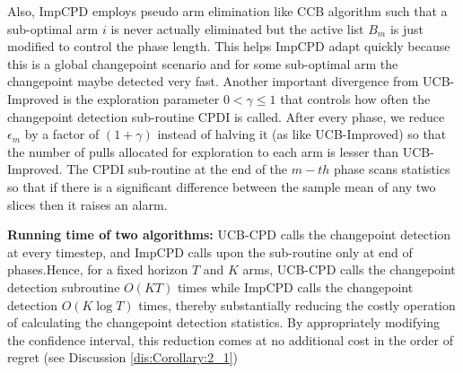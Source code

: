 Also, ImpCPD employs pseudo arm elimination like CCB \citep{liu2016modification} algorithm such that a sub-optimal arm $i$ is never actually eliminated but the active list $B_m$ is just modified to control the phase length. This helps ImpCPD adapt quickly because this is a global changepoint scenario and for some sub-optimal arm the changepoint maybe detected very fast. Another important divergence from UCB-Improved is the exploration parameter $0<\gamma\leq 1$ that controls how often the changepoint detection sub-routine CPDI is called. After every phase, we reduce $\epsilon_m$  by a factor of $\left( 1+\gamma\right)$ instead of halving it (as like UCB-Improved) so that the number of pulls allocated for exploration to each arm is lesser than UCB-Improved. The CPDI sub-routine at the end of the $m-th$ phase scans statistics so that if there is a significant difference between the sample mean of any two slices then it raises an alarm. 


\textbf{Running time of two algorithms:} UCB-CPD calls the changepoint detection at every timestep, and ImpCPD calls upon the sub-routine only at end of phases.Hence, for a fixed horizon $T$ and $K$ arms, UCB-CPD calls the changepoint detection subroutine $O(KT)$ times while ImpCPD calls the changepoint detection $O(K\log T)$ times, thereby substantially reducing the costly operation of calculating the changepoint detection statistics. By appropriately modifying the confidence interval, this reduction comes at no additional cost in the order of regret (see Discussion \ref{dis:Corollary:2_1})
